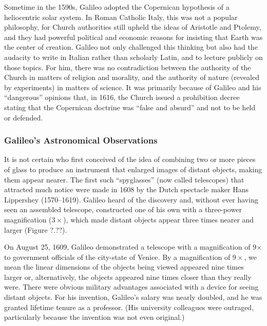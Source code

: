 \documentclass[../../main-astronomy.tex]{subfiles}
\begin{document}
\vspace{1em}

Sometime in the 1590s, Galileo adopted the Copernican hypothesis of a heliocentric solar system. In Roman Catholic Italy, this was not a popular philosophy, for Church authorities still upheld the ideas of Aristotle and Ptolemy, and they had powerful political and economic reasons for insisting that Earth was the center of creation. Galileo not only challenged this thinking but also had the audacity to write in Italian rather than scholarly Latin, and to lecture publicly on those topics. For him, there was no contradiction between the authority of the Church in matters of religion and morality, and the authority of nature (revealed by experiments) in matters of science. It was primarily because of Galileo and his ``dangerous'' opinions that, in 1616, the Church issued a prohibition decree stating that the Copernican doctrine was ``false and absurd'' and not to be held or defended.

\subsubsection*{Galileo's Astronomical Observations}

It is not certain who first conceived of the idea of combining two or more pieces of glass to produce an instrument that enlarged images of distant objects, making them appear nearer. The first such ``spyglasses'' (now called telescopes) that attracted much notice were made in 1608 by the Dutch spectacle maker Hans Lippershey (1570--1619). Galileo heard of the discovery and, without ever having seen an assembled telescope, constructed one of his own with a three-power magnification ($3\times$), which made distant objects appear three times nearer and larger (Figure ?.??).

\vspace{1em} %

On August 25, 1609, Galileo demonstrated a telescope with a magnification of 9× to government officials of the city-state of Venice. By a magnification of $9\times$, we mean the linear dimensions of the objects being viewed appeared nine times larger or, alternatively, the objects appeared nine times closer than they really were. There were obvious military advantages associated with a device for seeing distant objects. For his invention, Galileo's salary was nearly doubled, and he was granted lifetime tenure as a professor. (His university colleagues were outraged, particularly because the invention was not even original.)
\end{document}
